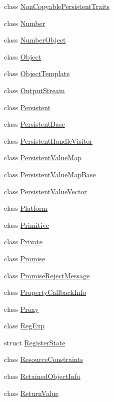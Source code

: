 \begin{DoxyCompactItemize}
class \hyperlink{classv8_1_1NonCopyablePersistentTraits}{Non\+Copyable\+Persistent\+Traits}
\item 
class \hyperlink{classv8_1_1Number}{Number}
\item 
class \hyperlink{classv8_1_1NumberObject}{Number\+Object}
\item 
class \hyperlink{classv8_1_1Object}{Object}
\item 
class \hyperlink{classv8_1_1ObjectTemplate}{Object\+Template}
\item 
class \hyperlink{classv8_1_1OutputStream}{Output\+Stream}
\item 
class \hyperlink{classv8_1_1Persistent}{Persistent}
\item 
class \hyperlink{classv8_1_1PersistentBase}{Persistent\+Base}
\item 
class \hyperlink{classv8_1_1PersistentHandleVisitor}{Persistent\+Handle\+Visitor}
\item 
class \hyperlink{classv8_1_1PersistentValueMap}{Persistent\+Value\+Map}
\item 
class \hyperlink{classv8_1_1PersistentValueMapBase}{Persistent\+Value\+Map\+Base}
\item 
class \hyperlink{classv8_1_1PersistentValueVector}{Persistent\+Value\+Vector}
\item 
class \hyperlink{classv8_1_1Platform}{Platform}
\item 
class \hyperlink{classv8_1_1Primitive}{Primitive}
\item 
class \hyperlink{classv8_1_1Private}{Private}
\item 
class \hyperlink{classv8_1_1Promise}{Promise}
\item 
class \hyperlink{classv8_1_1PromiseRejectMessage}{Promise\+Reject\+Message}
\item 
class \hyperlink{classv8_1_1PropertyCallbackInfo}{Property\+Callback\+Info}
\item 
class \hyperlink{classv8_1_1Proxy}{Proxy}
\item 
class \hyperlink{classv8_1_1RegExp}{Reg\+Exp}
\item 
struct \hyperlink{structv8_1_1RegisterState}{Register\+State}
\item 
class \hyperlink{classv8_1_1ResourceConstraints}{Resource\+Constraints}
\item 
class \hyperlink{classv8_1_1RetainedObjectInfo}{Retained\+Object\+Info}
\item 
class \hyperlink{classv8_1_1ReturnValue}{Return\+Value}
\item 

\end{DoxyCompactItemize}
